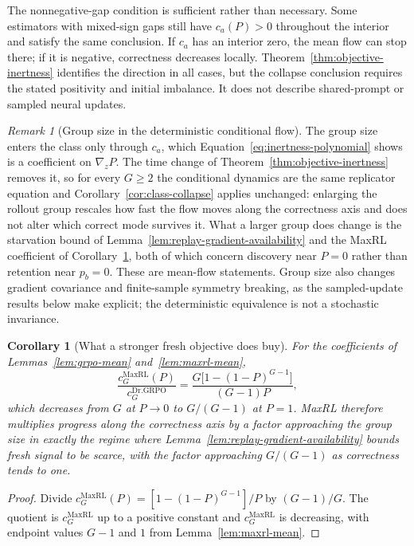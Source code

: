 \documentclass{article}
\newcommand{\enforcehalffinalproseline}{%
  \setlength{\parfillskip}{0pt plus .20\linewidth}}
\newcommand{\1}{\mathbf 1}
\newtheorem{corollary}[lemma]{Corollary}
\theoremstyle{remark}
\newtheorem{remark}[lemma]{Remark}
\theoremstyle{definition}
\theoremstyle{plain}
\begin{document}
The nonnegative-gap condition is sufficient rather than necessary. Some
estimators with mixed-sign gaps still have $c_a(P)>0$ throughout the interior
and satisfy the same conclusion. If $c_a$ has an interior zero, the mean flow
can stop there; if it is negative, correctness decreases locally.
Theorem~\ref{thm:objective-inertness} identifies the direction in all cases,
but the collapse conclusion requires the stated positivity and initial
imbalance. It does not describe shared-prompt or sampled neural updates.

\begin{remark}[Group size in the deterministic conditional flow]
\label{rem:group-size-inert}
The group size enters the class only through $c_a$, which
Equation~\eqref{eq:inertness-polynomial} shows is a coefficient on
$\nabla_zP$. The time change of Theorem~\ref{thm:objective-inertness} removes
it, so for every $G\ge2$ the conditional dynamics are the same replicator
equation and Corollary~\ref{cor:class-collapse} applies unchanged: enlarging
the rollout group rescales how fast the flow moves along the correctness axis
and does not alter which correct mode survives it. What a larger group does
change is the starvation bound of
Lemma~\ref{lem:replay-gradient-availability} and the MaxRL coefficient of
Corollary~\ref{cor:maxrl-starvation}, both of which concern discovery near
$P=0$ rather than retention near $p_b=0$. These are mean-flow statements. Group size also changes gradient covariance
and finite-sample symmetry breaking, as the sampled-update results below
make explicit; the deterministic equivalence is not a stochastic invariance.
\end{remark}

\begin{corollary}[What a stronger fresh objective does buy]
\enforcehalffinalproseline
\label{cor:maxrl-starvation}
For the coefficients of Lemmas~\ref{lem:grpo-mean} and~\ref{lem:maxrl-mean},
\[
 \frac{c_G^{\mathrm{MaxRL}}(P)}{c_G^{\mathrm{Dr.GRPO}}}
 =\frac{G\big[1-(1-P)^{G-1}\big]}{(G-1)P},
\]
which decreases from $G$ at $P\to0$ to $G/(G-1)$ at $P=1$. MaxRL therefore
multiplies progress along the correctness axis by a factor approaching the
group size in exactly the regime where
Lemma~\ref{lem:replay-gradient-availability} bounds fresh signal to be scarce,
with the factor approaching $G/(G-1)$ as correctness tends to one.
\end{corollary}

\begin{proof}
\enforcehalffinalproseline
Divide $c_G^{\mathrm{MaxRL}}(P)=[1-(1-P)^{G-1}]/P$ by $(G-1)/G$. The quotient
is $c_G^{\mathrm{MaxRL}}$ up to a positive constant and
$c_G^{\mathrm{MaxRL}}$ is decreasing, with endpoint values $G-1$ and $1$ from
Lemma~\ref{lem:maxrl-mean}.
\end{proof}
\end{document}
